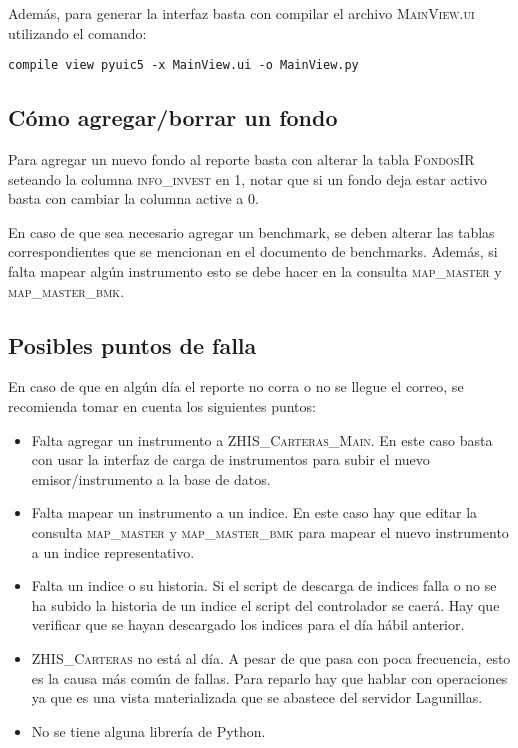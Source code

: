 \documentclass{article}
\begin{document}
Además, para generar la interfaz basta con compilar el archivo \textsc{MainView.ui} utilizando el comando:

\begin{center}
\texttt{compile view pyuic5 -x MainView.ui -o MainView.py}
\end{center}


\subsection{Cómo agregar/borrar un fondo}
Para agregar un nuevo fondo al reporte basta con alterar la tabla \textsc{FondosIR} seteando la columna \textsc{info\_invest} en 1, notar que si un fondo deja estar activo basta con cambiar la columna active a 0. 

En caso de que sea necesario agregar un benchmark, se deben alterar las tablas correspondientes que se mencionan en el documento de benchmarks. Además, si falta mapear algún instrumento esto se debe hacer en la consulta \textsc{map\_master} y \textsc{map\_master\_bmk}.


\subsection{Posibles puntos de falla}


En caso de que en algún día el reporte no corra o no se llegue el correo, se recomienda tomar en cuenta los siguientes puntos:
\begin{itemize}

\item Falta agregar un instrumento a \textsc{ZHIS\_Carteras\_Main}. En este caso basta con usar la interfaz de carga de instrumentos para subir el nuevo emisor/instrumento a la base de datos.

\item Falta mapear un instrumento a un indice. En este caso hay que editar la consulta \textsc{map\_master} y \textsc{map\_master\_bmk} para mapear el nuevo instrumento a un indice representativo.

\item Falta un indice o su historia. Si el script de descarga de indices falla o no se ha subido la historia de un indice el script del controlador se caerá. Hay que verificar que se hayan descargado los indices para el día hábil anterior. 

\item \textsc{ZHIS\_Carteras} no está al día. A pesar de que pasa con poca frecuencia, esto es la causa más común de fallas. Para reparlo hay que hablar con operaciones ya que es una vista materializada que se abastece del servidor Lagunillas.

\item No se tiene alguna librería de Python.
\end{itemize}
\end{document}
